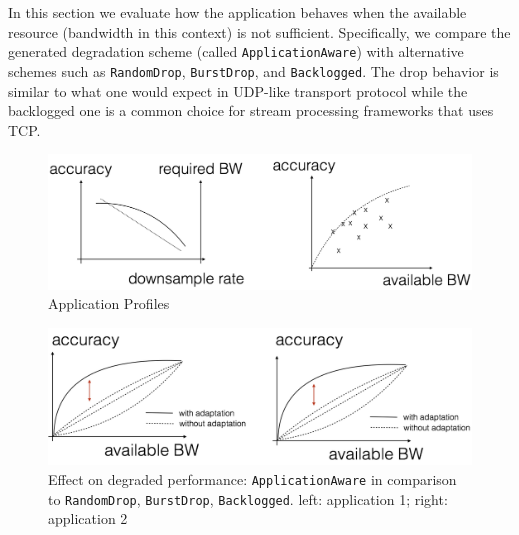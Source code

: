 In this section we evaluate how the application behaves when the available
resource (bandwidth in this context) is not sufficient. Specifically, we compare
the generated degradation scheme (called \texttt{ApplicationAware}) with
alternative schemes such as \texttt{RandomDrop}, \texttt{BurstDrop}, and
\texttt{Backlogged}. The drop behavior is similar to what one would expect in
UDP-like transport protocol while the backlogged one is a common choice for
stream processing frameworks that uses TCP.

\begin{figure}
  \centering
  \includegraphics[width=.95\linewidth]{figures/tradeoff-placeholder.png}
  \caption{Application Profiles}
  \label{fig:eval-profile}
\end{figure}

\begin{figure}
  \centering
  \includegraphics[width=.95\linewidth]{figures/degrade-placeholder.png}
  \caption{Effect on degraded performance: \texttt{ApplicationAware} in
    comparison to \texttt{RandomDrop}, \texttt{BurstDrop},
    \texttt{Backlogged}. left: application 1; right: application 2}
  \label{fig:degrade}
\end{figure}

